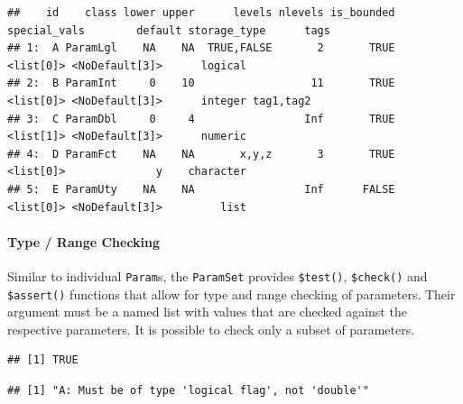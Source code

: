 \documentclass[
]{scrbook}
\newenvironment{Shaded}{\begin{snugshade}}{\end{snugshade}}
\newcommand{\AttributeTok}[1]{\textcolor[rgb]{0.77,0.63,0.00}{#1}}
\newcommand{\ConstantTok}[1]{\textcolor[rgb]{0.00,0.00,0.00}{#1}}
\newcommand{\DecValTok}[1]{\textcolor[rgb]{0.00,0.00,0.81}{#1}}
\newcommand{\FunctionTok}[1]{\textcolor[rgb]{0.00,0.00,0.00}{#1}}
\newcommand{\NormalTok}[1]{#1}
\newcommand{\SpecialCharTok}[1]{\textcolor[rgb]{0.00,0.00,0.00}{#1}}
\renewenvironment{Shaded} {\begin{snugshade}\small} {\end{snugshade}}
\begin{document}
\begin{verbatim}
##    id    class lower upper      levels nlevels is_bounded special_vals        default storage_type      tags
## 1:  A ParamLgl    NA    NA  TRUE,FALSE       2       TRUE    <list[0]> <NoDefault[3]>      logical          
## 2:  B ParamInt     0    10                  11       TRUE    <list[0]> <NoDefault[3]>      integer tag1,tag2
## 3:  C ParamDbl     0     4                 Inf       TRUE    <list[1]> <NoDefault[3]>      numeric          
## 4:  D ParamFct    NA    NA       x,y,z       3       TRUE    <list[0]>              y    character          
## 5:  E ParamUty    NA    NA                 Inf      FALSE    <list[0]> <NoDefault[3]>         list
\end{verbatim}

\hypertarget{type-range-checking-1}{%
\paragraph{Type / Range Checking}\label{type-range-checking-1}}

Similar to individual \texttt{Param}s, the \texttt{ParamSet} provides \texttt{\$test()}, \texttt{\$check()} and \texttt{\$assert()} functions that allow for type and range checking of parameters.
Their argument must be a named list with values that are checked against the respective parameters.
It is possible to check only a subset of parameters.

\begin{Shaded}
\end{Shaded}

\begin{verbatim}
## [1] TRUE
\end{verbatim}

\begin{Shaded}
\end{Shaded}

\begin{verbatim}
## [1] "A: Must be of type 'logical flag', not 'double'"
\end{verbatim}
\end{document}
